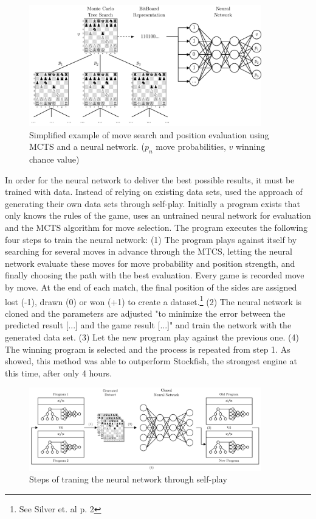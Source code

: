 \begin{figure}[h]
\centering
\includegraphics[width=0.9\textwidth]{graphics/alphazero/alphazero.png}
\caption{Simplified example of move search and position evaluation using MCTS and a neural network. ($p_{n}$ move probabilities, $v$ winning chance value)}
\end{figure}

In order for the neural network to deliver the best possible results, it must be trained with data. Instead of relying on existing data sets, \cite{alphazero-2018} used the approach of generating their own data sets through self-play. Initially a program exists that only knows the rules of the game, uses an untrained neural network for evaluation and the MCTS algorithm for move selection. The program executes the following four steps to train the neural network: (1) The program plays against itself by searching for several moves in advance through the MTCS, letting the neural network evaluate these moves for move probability and position strength, and finally choosing the path with the best evaluation. Every game is recorded move by move. At the end of each match, the final position of the sides are assigned lost (-1), drawn (0) or won (+1) to create a dataset.\footnote{See Silver et. al p. 2} (2) The neural network is cloned and the parameters are adjusted "to minimize the error between the predicted result [...] and the game result [...]" and train the network with the generated data set. (3) Let the new program play against the previous one. (4) The winning program is selected and the process is repeated from step 1. As \cite{alphazero-2018}  showed, this method was able to outperform Stockfish, the strongest engine at this time, after only 4 hours.

\begin{figure}[h]
\centering
\includegraphics[width=0.9\textwidth]{graphics/alphazero/selfplay.png}
\caption{Steps of traning the neural network through self-play}
\end{figure}